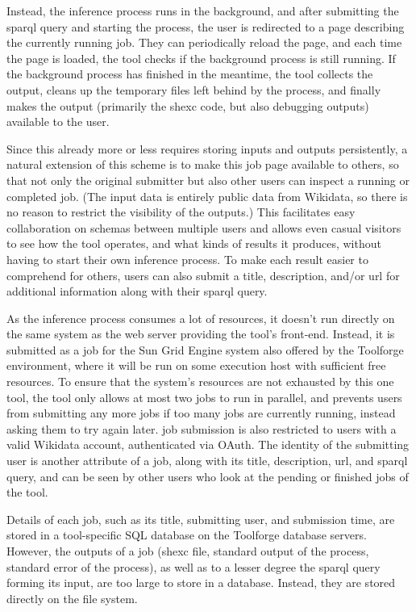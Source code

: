 Instead, the inference process runs in the background,
and after submitting the \gls{sparql} query and starting the process,
the user is redirected to a page describing the currently running \gls{job}.
They can periodically reload the page,
and each time the page is loaded,
the tool checks if the background process is still running.
If the background process has finished in the meantime,
the tool collects the output,
cleans up the temporary files left behind by the process,
and finally makes the output
(primarily the \gls{shexc} code, but also debugging outputs)
available to the user.

Since this already more or less requires storing inputs and outputs persistently,
a natural extension of this scheme is to make this \gls{job} page available to others,
so that not only the original submitter but also other users can inspect a running or completed \gls{job}.
(The input data is entirely public data from \gls{Wikidata},
so there is no reason to restrict the visibility of the outputs.)
This facilitates easy collaboration on \glspl{schema} between multiple users
and allows even casual visitors to see how the tool operates,
and what kinds of results it produces,
without having to start their own inference process.
To make each result easier to comprehend for others,
users can also submit a title, description, and/or \gls{url} for additional information
along with their \gls{sparql} query.

As the inference process consumes a lot of resources,
it doesn’t run directly on the same system as the web server providing the tool’s front-end.
Instead, it is submitted as a job for the Sun Grid Engine system also offered by the Toolforge environment,
where it will be run on some execution host with sufficient free resources.
To ensure that the system’s resources are not exhausted by this one tool,
the tool only allows at most two \glspl{job} to run in parallel,
and prevents users from submitting any more \glspl{job} if too many \glspl{job} are currently running,
instead asking them to try again later.
\Gls{job} submission is also restricted to users with a valid \gls{Wikidata} account,
authenticated via OAuth.
The identity of the submitting user is another attribute of a \gls{job},
along with its title, description, \gls{url}, and \gls{sparql} query,
and can be seen by other users who look at the pending or finished \glspl{job} of the tool.

Details of each \gls{job},
such as its title, submitting user, and submission time,
are stored in a tool-specific SQL database on the Toolforge database servers.
However, the outputs of a \gls{job}
(\gls{shexc} file, standard output of the process, standard error of the process),
as well as to a lesser degree the \gls{sparql} query forming its input,
are too large to store in a database.
Instead, they are stored directly on the file system.

